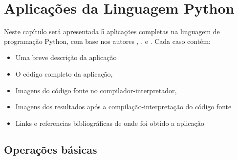 


\chapter{ Aplica\c{c}\~{o}es da Linguagem Python}

Neste capítulo será apresentada 5 aplicações completas na linguagem de programação Python, com base nos autores \cite{Perkovic2016}, \cite{Borges2014}, \cite{Severance2016} e \cite{Lutz2007}. Cada caso contém:
\begin{itemize}
  \item Uma breve descri\c{c}\~{a}o da aplica\c{c}\~{a}o
  \item O c\'{o}digo completo da aplica\c{c}\~{a}o,
  \item Imagens do c\'{o}digo fonte no compilador-interpretador,
  \item Imagens dos resultados ap\'{o}s a compila\c{c}\~{a}o-interpreta\c{c}\~{a}o do c\'{o}digo fonte
  \item Links e referencias bibliogr\'{a}ficas de onde foi obtido a aplica\c{c}\~{a}o
\end{itemize}




    \section{Opera\c{c}\~{o}es b\'{a}sicas}
    
